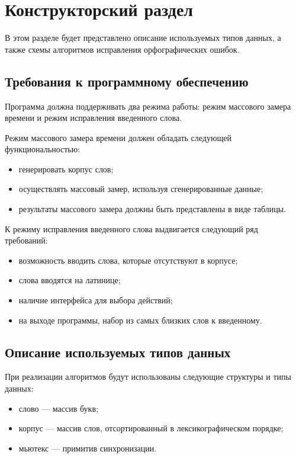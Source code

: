 \chapter{Конструкторский раздел}

В этом разделе будет представлено описание используемых типов данных, а также схемы алгоритмов исправления орфографических ошибок.

\section{Требования к программному обеспечению}

Программа должна поддерживать два режима работы: режим массового замера времени и режим исправления введенного слова.

Режим массового замера времени должен обладать следующей функциональностью:
\begin{itemize}
	\item генерировать корпус слов;
	\item осуществлять массовый замер, используя сгенерированные данные;
	\item результаты массового замера должны быть представлены в виде таблицы.
\end{itemize}

К режиму исправления введенного слова выдвигается следующий ряд требований:
\begin{itemize}
	\item возможность вводить слова, которые отсутствуют в корпусе;
	\item слова вводятся на латинице;
	\item наличие интерфейса для выбора действий;
	\item на выходе программы, набор из самых близких слов к введенному.
\end{itemize}



\section{Описание используемых типов данных}

При реализации алгоритмов будут использованы следующие структуры
и типы данных:
\begin{itemize}
	\item слово --- массив букв;
	\item корпус --- массив слов, отсортированный в лексикографическом порядке;
	\item мьютекс --- примитив синхронизации.
\end{itemize}

